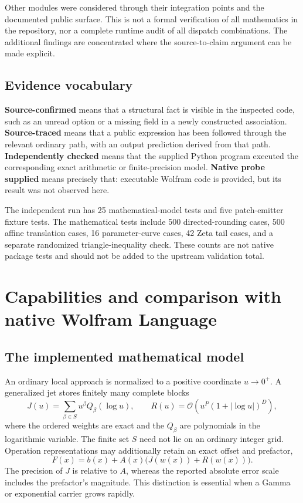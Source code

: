 \documentclass[11pt,a4paper]{article}
\newcommand{\OO}{\mathcal O}
\begin{document}
Other modules were considered through their integration points and the documented public surface. This is not a formal verification of all mathematics in the repository, nor a complete runtime audit of all dispatch combinations. The additional findings are concentrated where the source-to-claim argument can be made explicit.

\subsection{Evidence vocabulary}

\textbf{Source-confirmed} means that a structural fact is visible in the inspected code, such as an unread option or a missing field in a newly constructed association. \textbf{Source-traced} means that a public expression has been followed through the relevant ordinary path, with an output prediction derived from that path. \textbf{Independently checked} means that the supplied Python program executed the corresponding exact arithmetic or finite-precision model. \textbf{Native probe supplied} means precisely that: executable Wolfram code is provided, but its result was not observed here.

The independent run has 25 mathematical-model tests and five patch-emitter fixture tests. The mathematical tests include 500 directed-rounding cases, 500 affine translation cases, 16 parameter-curve cases, 42 Zeta tail cases, and a separate randomized triangle-inequality check. These counts are not native package tests and should not be added to the upstream validation total.

\section{Capabilities and comparison with native Wolfram Language}\label{sec:comparison}

\subsection{The implemented mathematical model}

An ordinary local approach is normalized to a positive coordinate $u\to0^+$. A generalized jet stores finitely many complete blocks
\begin{equation}
 J(u)=\sum_{\beta\in S}u^\beta Q_\beta(\log u),\qquad
 R(u)=\OO\!\left(u^P(1+|\log u|)^D\right),
\end{equation}
where the ordered weights are exact and the $Q_\beta$ are polynomials in the logarithmic variable. The finite set $S$ need not lie on an ordinary integer grid. Operation representations may additionally retain an exact offset and prefactor,
\begin{equation}\label{eq:representation}
 F(x)=b(x)+A(x)\bigl(J(w(x))+R(w(x))\bigr).
\end{equation}
The precision of $J$ is relative to $A$, whereas the reported absolute error scale includes the prefactor's magnitude. This distinction is essential when a Gamma or exponential carrier grows rapidly.\cite{core,operations,envelopes}
\end{document}
